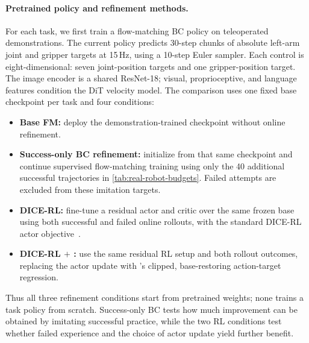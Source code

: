 \paragraph{Pretrained policy and refinement methods.}
For each task, we first train a flow-matching BC policy on teleoperated
demonstrations. The current policy predicts 30-step chunks of absolute
left-arm joint and gripper targets at 15\,Hz, using a 10-step Euler sampler.
Each control is eight-dimensional: seven joint-position targets and one
gripper-position target. The image encoder is a shared ResNet-18; visual,
proprioceptive, and language features condition the DiT velocity model.
The comparison uses one fixed base checkpoint per task and four conditions:
\begin{itemize}
  \item \textbf{Base FM:} deploy the demonstration-trained checkpoint without
  online refinement.
  \item \textbf{Success-only BC refinement:} initialize from that same
  checkpoint and continue supervised flow-matching training using only
  the 40 additional successful trajectories in
  \cref{tab:real-robot-budgets}. Failed attempts are excluded from these
  imitation targets.
  \item \textbf{DICE-RL:} fine-tune a residual actor and critic over the same
  frozen base using both successful and failed online rollouts, with the
  standard DICE-RL actor objective~\citep{dicerl2026}.
  \item \textbf{DICE-RL $+$ \method{}:} use the same residual RL setup and both
  rollout outcomes, replacing the actor update with \method{}'s clipped,
  base-restoring action-target regression.
\end{itemize}
Thus all three refinement conditions start from pretrained weights; none
trains a task policy from scratch. Success-only BC tests how much improvement
can be obtained by imitating successful practice, while the two RL conditions
test whether failed experience and the choice of actor update yield further
benefit.

